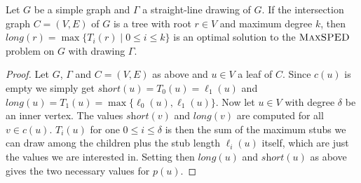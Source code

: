 \documentclass[a4paper,english,numberwithinsect]{eurocg18}
\newcommand{\maxsped}{\ensuremath{\textsc{MaxSPED}}\xspace}
\newcommand{\sollong}{\ensuremath{\textit{long}}\xspace}
\newcommand{\solshort}{\ensuremath{\textit{short}}\xspace}
\begin{document}
\begin{lemma}
	\label{lem:tree_correctness}	
	Let $ G $ be a simple graph and $ \Gamma $ a straight-line drawing of $ G $. If the intersection graph $ C = (V,E) $ of $ G $ is a tree with root $ r \in V $ and maximum degree $ k $, then $ \sollong(r) = \max \{T_i(r) \mid 0 \leq i \leq k \} $ is an optimal solution to the \maxsped problem on $ G $ with drawing $ \Gamma $.
\end{lemma}
\begin{proof}
	Let $ G $, $ \Gamma $ and $ C = (V,E) $ as above and $ u \in V $ a leaf of $ C $. Since $ c(u) $ is empty we simply get $ \solshort(u) = T_0(u) = \ell_1(u) $ and $ \sollong(u) = T_1(u) = \max\{\ell_0(u), \ell_1(u)\} $. Now let $ u \in V $ with degree $ \delta $ be an inner vertex. The values $ \solshort(v) $ and $ \sollong(v) $ are computed for all $ v \in c(u) $. $ T_i(u) $ for one $ 0 \leq i \leq \delta $ is then the sum of the maximum stubs we can draw among the children plus the stub length $ \ell_i(u) $ itself, which are just the values we are interested in. Setting then $ \sollong(u) $ and $ \solshort(u) $ as above gives the two necessary values for $ p(u) $.
	
\end{proof}
\end{document}
